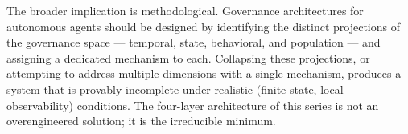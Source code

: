\documentclass[11pt]{article}
\begin{document}
The broader implication is methodological. Governance architectures for
autonomous agents should be designed by identifying the distinct projections
of the governance space --- temporal, state, behavioral, and population ---
and assigning a dedicated mechanism to each. Collapsing these projections,
or attempting to address multiple dimensions with a single mechanism,
produces a system that is provably incomplete under realistic (finite-state,
local-observability) conditions. The four-layer architecture of this series
is not an overengineered solution; it is the irreducible minimum.



\end{document}
